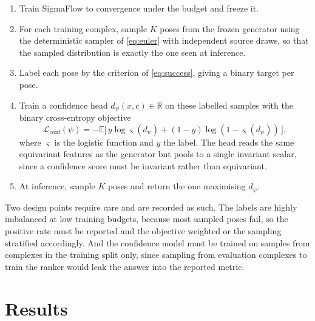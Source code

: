 \documentclass[11pt,a4paper]{report}
\theoremstyle{plain}
\theoremstyle{definition}
\theoremstyle{remark}
\newcommand{\R}{\mathbb{R}}
\newcommand{\E}{\mathbb{E}}
\newcommand{\Loss}{\mathcal{L}}
\newcommand{\ctx}{c}
\begin{document}
\begin{enumerate}[leftmargin=*,itemsep=3pt]
\item Train SigmaFlow to convergence under the budget and freeze it.
\item For each training complex, sample $K$ poses from the frozen generator
      using the deterministic sampler of \eqref{eq:euler} with independent
      source draws, so that the sampled distribution is exactly the one seen at
      inference.
\item Label each pose by the criterion of \eqref{eq:success}, giving a binary
      target per pose.
\item Train a confidence head $d_\psi(x,\ctx) \in \R$ on these labelled samples
      with the binary cross-entropy objective
      \begin{equation}
        \Loss_{\mathrm{conf}}(\psi)
        = -\E\bigl[\, y \log \varsigma(d_\psi) + (1-y)\log(1-\varsigma(d_\psi))\,\bigr],
        \label{eq:conf-loss}
      \end{equation}
      where $\varsigma$ is the logistic function and $y$ the label. The head
      reads the same equivariant features as the generator but pools to a
      single invariant scalar, since a confidence score must be invariant
      rather than equivariant.
\item At inference, sample $K$ poses and return the one maximising $d_\psi$.
\end{enumerate}

Two design points require care and are recorded as such. The labels are highly
imbalanced at low training budgets, because most sampled poses fail, so the
positive rate must be reported and the objective weighted or the sampling
stratified accordingly. And the confidence model must be trained on samples
from complexes in the training split only, since sampling from evaluation
complexes to train the ranker would leak the answer into the reported metric.

\section{Results}
\end{document}
